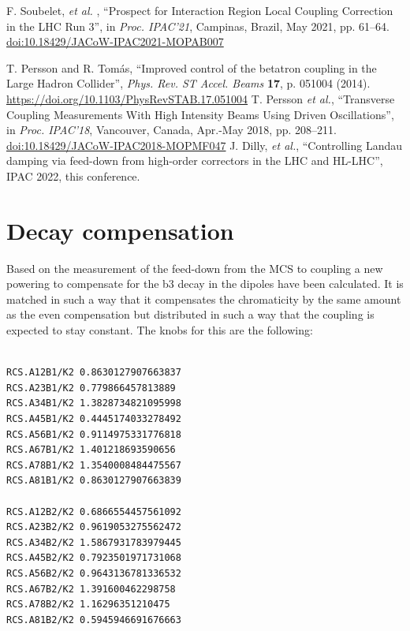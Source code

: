 \documentclass[a4paper]{cernatsnote}
\begin{document}
\begin{thebibliography}{99}
   F. Soubelet,  {\it et al.} ,
   \textquotedblleft{Prospect for Interaction Region Local Coupling Correction in the LHC Run 3}\textquotedblright,
   in \emph{Proc. IPAC’21}, Campinas, Brazil, May 2021, pp. 61--64.
   \url{doi:10.18429/JACoW-IPAC2021-MOPAB007}  

 T. Persson and R. Tom\'as, ``Improved control of the betatron coupling in the Large Hadron Collider'',
{\it Phys. Rev. ST Accel. Beams} {\bf 17}, p. 051004 (2014).
\url{https://doi.org/10.1103/PhysRevSTAB.17.051004}
%
    T. Persson \emph{et al.},
   \textquotedblleft{Transverse Coupling Measurements With High Intensity Beams Using Driven Oscillations}\textquotedblright,
   in \emph{Proc. IPAC’18}, Vancouver, Canada, Apr.-May 2018, pp. 208--211.
   \url{doi:10.18429/JACoW-IPAC2018-MOPMF047}    
%
 J. Dilly, {\it et al.}, ``Controlling Landau damping via feed-down from high-order correctors in the LHC and HL-LHC'', IPAC 2022, this conference.

\end{thebibliography}
\appendix
\section{Decay compensation}
Based on the measurement of the feed-down from the MCS to coupling a new powering to compensate for the b3 decay in the dipoles have been calculated. It is matched in such a way that it compensates the chromaticity by the same amount as the even compensation but distributed in such a way that the coupling is expected to stay constant. The knobs for this are the following:
\begin{verbatim}

RCS.A12B1/K2 0.8630127907663837 
RCS.A23B1/K2 0.779866457813889 
RCS.A34B1/K2 1.3828734821095998 
RCS.A45B1/K2 0.4445174033278492 
RCS.A56B1/K2 0.9114975331776818 
RCS.A67B1/K2 1.401218693590656 
RCS.A78B1/K2 1.3540008484475567 
RCS.A81B1/K2 0.8630127907663839 

RCS.A12B2/K2 0.6866554457561092 
RCS.A23B2/K2 0.9619053275562472 
RCS.A34B2/K2 1.5867931783979445 
RCS.A45B2/K2 0.7923501971731068 
RCS.A56B2/K2 0.9643136781336532 
RCS.A67B2/K2 1.391600462298758 
RCS.A78B2/K2 1.16296351210475 
RCS.A81B2/K2 0.5945946691676663 

\end{verbatim}
\end{document}
